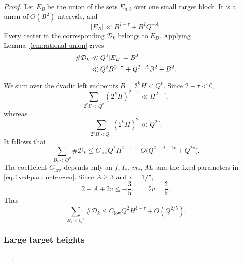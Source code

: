 \documentclass[11pt]{amsart}
\numberwithin{equation}{section}
\theoremstyle{definition}
\theoremstyle{remark}
\begin{document}
\begin{proof}
Let $E_B$ be the union of the sets $E_{a,b}$ over one small target
block. It is a union of $O(B^2)$ intervals, and
\begin{equation}\label{eq:low-target-length-en}
|E_B|\ll B^{2-\tau}+B^2Q^{-A}.
\end{equation}
Every center in the corresponding $\mathcal D_k$ belongs to $E_B$.
Applying Lemma~\ref{lem:rational-union} gives
\begin{align}
\#\mathcal D_k
&\ll Q^2|E_B|+B^2\notag\\
&\ll
Q^2B^{2-\tau}
+Q^{2-A}B^2
+B^2.
\label{eq:low-block-count-en}
\end{align}

We sum over the dyadic left endpoints $B=2^kH<Q^v$. Since
$2-\tau<0$,
\[
\sum_{2^kH<Q^v}(2^kH)^{2-\tau}
\ll H^{2-\tau},
\]
whereas
\[
\sum_{2^kH<Q^v}(2^kH)^2\ll Q^{2v}.
\]
It follows that
\begin{equation}\label{eq:low-total-en}
\sum_{B_k<Q^v}\#\mathcal D_k
\leq
C_{\mathrm{low}}Q^2H^{2-\tau}
+O\bigl(Q^{2-A+2v}+Q^{2v}\bigr).
\end{equation}
The coefficient $C_{\mathrm{low}}$ depends only on
$f$, $I_*$, $m_*$, $M_*$ and the fixed parameters in
\eqref{eq:fixed-parameters-en}. Since $A\geq3$ and $v=1/5$,
\[
2-A+2v\leq-\frac35,
\qquad
2v=\frac25.
\]
Thus
\begin{equation}\label{eq:low-final-en}
\sum_{B_k<Q^v}\#\mathcal D_k
\leq
C_{\mathrm{low}}Q^2H^{2-\tau}+O(Q^{2/5}).
\end{equation}

\subsubsection*{Large target heights}


\end{proof}
\end{document}
